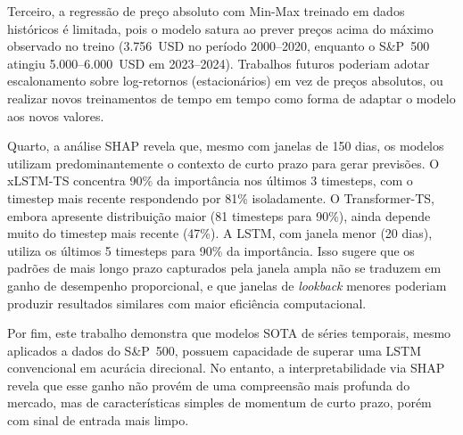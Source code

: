 Terceiro, a regressão de preço absoluto com Min-Max treinado em dados históricos é limitada, pois o modelo satura ao prever preços acima do máximo observado no treino (3.756~USD no período 2000--2020, enquanto o S\&P~500 atingiu 5.000--6.000~USD em 2023--2024). Trabalhos futuros poderiam adotar escalonamento sobre log-retornos (estacionários) em vez de preços absolutos, ou realizar novos treinamentos de tempo em tempo como forma de adaptar o modelo aos novos valores.

Quarto, a análise SHAP revela que, mesmo com janelas de 150 dias, os modelos utilizam predominantemente o contexto de curto prazo para gerar previsões. O xLSTM-TS concentra 90\% da importância nos últimos 3 timesteps, com o timestep mais recente respondendo por 81\% isoladamente. O Transformer-TS, embora apresente distribuição maior (81 timesteps para 90\%), ainda depende muito do timestep mais recente (47\%). A LSTM, com janela menor (20 dias), utiliza os últimos 5 timesteps para 90\% da importância. Isso sugere que os padrões de mais longo prazo capturados pela janela ampla não se traduzem em ganho de desempenho proporcional, e que janelas de \textit{lookback} menores poderiam produzir resultados similares com maior eficiência computacional.

Por fim, este trabalho demonstra que modelos SOTA de séries temporais, mesmo aplicados a dados do S\&P~500, possuem capacidade de superar uma LSTM convencional em acurácia direcional. No entanto, a interpretabilidade via SHAP revela que esse ganho não provém de uma compreensão mais profunda do mercado, mas de características simples de momentum de curto prazo, porém com sinal de entrada mais limpo.
